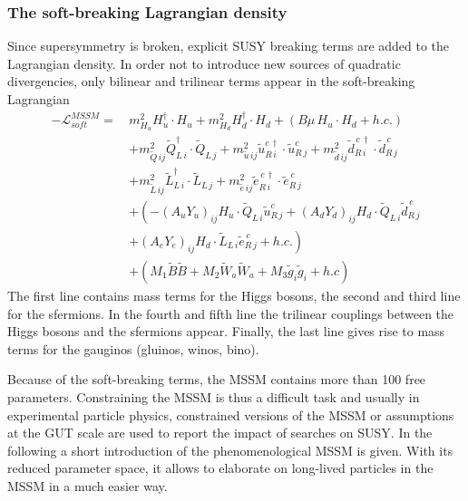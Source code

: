 \subsubsection*{The soft-breaking Lagrangian density}
Since supersymmetry is broken, explicit SUSY breaking terms are added to the Lagrangian density.
In order not to introduce new sources of quadratic divergencies, only bilinear and trilinear terms appear in the soft-breaking Lagrangian
\begin{equation}
 \begin{split}
  - \mathcal{L}^{MSSM}_{soft} =\,& m_{H_u}^2 H_u^{\dagger} \cdot H_u +m_{H_d}^2 H_d^{\dagger} \cdot H_d + \left(B\mu\, H_u \cdot H_d + h.c.\right) \\
  & + m_{\tilde{Q}\,ij}^2 \tilde{Q}_{L\,i}^{\dagger} \cdot \tilde{Q}_{L\,j}+ m_{\tilde{u}\,ij}^2 \tilde{u}_{R\,i}^{c\,\dagger} \cdot \tilde{u}_{R\,j}^c
+ m_{\tilde{d}\,ij}^2 \tilde{d}_{R\,i}^{\,c\,\dagger} \cdot \tilde{d}_{R\,j}^{\,c}\\
& + m_{\tilde{L}\,ij}^2 \tilde{L}_{L\,i}^{\dagger} \cdot \tilde{L}_{L\,j}+ m_{\tilde{e}\,ij}^2 \tilde{e}_{R\,i}^{\,c\,\dagger} \cdot \tilde{e}_{R\,j}^{\,c}\\
& +\left(- \left( A_u Y_u \right)_{ij} H_u \cdot \tilde{Q}_{L\,i} \tilde{u}_{R\,j}^c +\left( A_d Y_d \right)_{ij} H_d \cdot \tilde{Q}_{L\,i} \tilde{d}_{R\,j}^{\,c} \right.\\
& \left. +\left( A_e Y_e \right)_{ij} H_d \cdot \tilde{L}_{L\,i} \tilde{e}_{R\,j}^{\,c} + h.c. \right)\\
& + \left(M_1 \tilde{B} \tilde{B} + M_2 \tilde{W}_a \tilde{W}_a + M_3 \tilde{g}_i \tilde{g}_i + h.c \right)
 \end{split}
\label{eq:SoftTerms}
\end{equation}
The first line contains mass terms for the Higgs bosons, the second and third line for the sfermions.
In the fourth and fifth line the trilinear couplings between the Higgs bosons and the sfermions appear.
Finally, the last line gives rise to mass terms for the gauginos (gluinos, winos, bino).

Because of the soft-breaking terms, the MSSM contains more than 100 free parameters.
Constraining the MSSM is thus a difficult task and usually in experimental particle physics, constrained versions of the MSSM or assumptions at the GUT scale are used to report the impact of searches on SUSY. 
In the following a short introduction of the phenomenological MSSM is given.
With its reduced parameter space, it allows to elaborate on long-lived particles in the MSSM in a much easier way.

